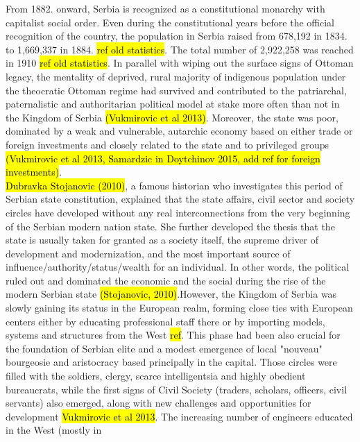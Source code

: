 \documentclass[11pt]{report}
\begin{document}
From 1882. onward, Serbia is recognized as a constitutional monarchy with capitalist social order. Even during the constitutional years before the official recognition of the country, the population in Serbia raised from 678,192 in 1834. to 1,669,337 in 1884. \hl{ref old statistics}. The total number of 2,922,258 was reached in 1910 \hl{ref old statistics}. 
In parallel with wiping out the surface signs of Ottoman legacy, the mentality of deprived, rural majority of indigenous population under the theocratic Ottoman regime had survived and contributed to the patriarchal, paternalistic and authoritarian political model \footnotemark  at stake more often than not in the Kingdom of Serbia \hl{(Vukmirovic et al 2013)}. Moreover, the state was poor, dominated by a weak and vulnerable, autarchic economy based on either trade or foreign investments and closely related to the state and to privileged groups \hl{(Vukmirovic et al 2013, Samardzic in Doytchinov 2015, add ref for foreign investments)}.
\\
\hl{Dubravka Stojanovic (2010)}, a famous historian who investigates this period of Serbian state constitution, explained that the state affairs, civil sector and society circles have developed without any real interconnections from the very beginning of the Serbian modern nation state. She further developed the thesis that the state is usually taken for granted as a society itself, the supreme driver of development and modernization, and the most important source of influence/authority/status/wealth for an individual. In other words, the political ruled out and dominated the economic and the social during the rise of the modern Serbian state \hl{(Stojanovic, 2010)}.\footnotemark However, the Kingdom of Serbia was slowly gaining its status in the European realm, forming close ties with European centers either by educating professional staff there or by importing models, systems and structures from the West \hl{ref}. This phase had been also crucial for the foundation of Serbian elite and a modest emergence of local "nouveau" bourgeosie and aristocracy based principally in the capital.
Those circles were filled with the soldiers, clergy, scarce intelligentsia and highly obedient bureaucrats, while the  first  signs  of  Civil  Society (traders, scholars, officers, civil servants) also emerged, along with new challenges and  opportunities  for  development \hl{Vukmirovic et al 2013}.
The increasing number of engineers educated in the West (mostly in 
\end{document}
